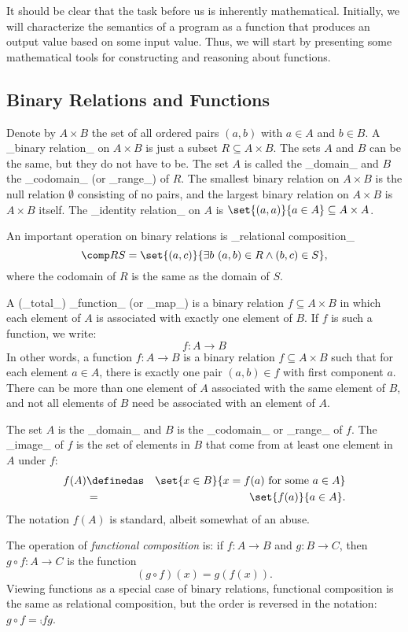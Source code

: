 It should be clear that the task before us is inherently mathematical.
Initially, we will characterize the semantics of a program as a function
that produces an output value based on some input value.
Thus, we will start by presenting some mathematical
tools for constructing and reasoning about functions.

\subsection{Binary Relations and Functions}

Denote by $A\times B$ the set of all ordered pairs $(a,b)$ with $a\in A$ and $b\in B$.
A _binary relation_ on $A\times B$ is just a subset $R\subseteq A\times B$.
The sets $A$ and $B$ can be the same, but they do not have to be. The set $A$
is called the _domain_ and $B$ the _codomain_ (or _range_) of $R$. The smallest binary
relation on $A\times B$ is the null relation $\emptyset$ consisting
of no pairs, and the largest binary relation on $A\times B$ is $A\times B$ itself.
The _identity relation_ on $A$ is $\set{(a,a)}{a\in A}\subseteq A\times A$.

An important operation on binary relations is _relational composition_
\[
\comp RS = \set{(a,c)}{\exists b\ (a,b)\in R \wedge (b,c)\in S},
\]
where the codomain of $R$ is the same as the domain of $S$.

A (_total_) _function_ (or _map_) is a binary relation $f\subseteq A\times B$ in which each element of $A$
is associated with exactly one element of $B$. If $f$ is such a function, we write:
\[
f : A \to B
\]
In other words, a function $f:A\to B$ is a binary relation $f\subseteq A\times B$ such that for each
element $a\in A$, there is exactly one pair $(a,b)\in f$ with first component $a$.
There can be more than one element of $A$ associated with the same element of $B$, and not all elements
of $B$ need be associated with an element of $A$. 

The set $A$ is the _domain_ and $B$ is the
_codomain_ or _range_ of $f$. The _image_ of $f$ is the set of elements in
$B$ that come from at least one element in $A$ under $f$:
\begin{eqnarray*}
f(A) &\definedas& \set{x\in B}{x = f(a) \text{ for some } a\in A}\\
&=& \set{f(a)}{a\in A}.
\end{eqnarray*}
The notation $f(A)$ is standard, albeit somewhat of an abuse.

The operation of \emph{functional composition} is: if $f:A\to B$ and $g:B\to C$, then $g\circ f:A\to C$ is the function
\[
(g\circ f)(x) = g(f(x)).
\]
Viewing functions as a special case of binary relations, functional composition is the same as relational composition, but the order is reversed in the notation: $g\circ f=\comp fg$.

